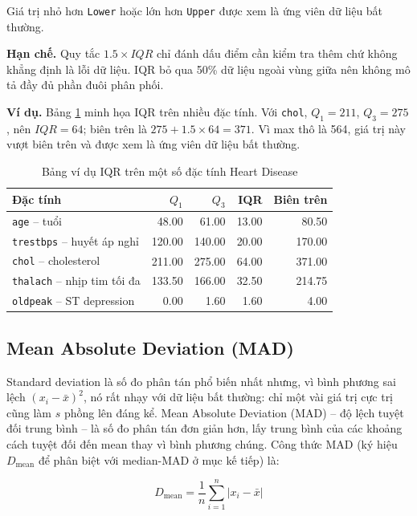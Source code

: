 Giá trị nhỏ hơn \texttt{Lower} hoặc lớn hơn \texttt{Upper} được xem là ứng viên dữ liệu bất thường.

\textbf{Hạn chế.} Quy tắc $1.5\times IQR$ chỉ đánh dấu điểm cần kiểm tra thêm chứ không khẳng định là lỗi dữ liệu. IQR bỏ qua 50\% dữ liệu ngoài vùng giữa nên không mô tả đầy đủ phần đuôi phân phối.

\textbf{Ví dụ.} Bảng \ref{tab:chapter1_iqr_example} minh họa IQR trên nhiều đặc tính. Với \texttt{chol}, $Q_1=211$, $Q_3=275$, nên $IQR=64$; biên trên là $275+1.5\times64=371$. Vì max thô là 564, giá trị này vượt biên trên và được xem là ứng viên dữ liệu bất thường.

\begin{table}[H]
\centering
\caption{Bảng ví dụ IQR trên một số đặc tính Heart Disease}
\label{tab:chapter1_iqr_example}
\small
\begin{tabular}{lrrrr}
\toprule
Đặc tính & $Q_1$ & $Q_3$ & IQR & Biên trên \\
\midrule
\texttt{age} -- tuổi & 48.00 & 61.00 & 13.00 & 80.50 \\
\texttt{trestbps} -- huyết áp nghỉ & 120.00 & 140.00 & 20.00 & 170.00 \\
\texttt{chol} -- cholesterol & 211.00 & 275.00 & 64.00 & 371.00 \\
\texttt{thalach} -- nhịp tim tối đa & 133.50 & 166.00 & 32.50 & 214.75 \\
\texttt{oldpeak} -- ST depression & 0.00 & 1.60 & 1.60 & 4.00 \\
\bottomrule
\end{tabular}
\end{table}

\subsection{Mean Absolute Deviation (MAD)}

Standard deviation là số đo phân tán phổ biến nhất nhưng, vì bình phương sai lệch $(x_i-\bar{x})^2$, nó rất nhạy với dữ liệu bất thường: chỉ một vài giá trị cực trị cũng làm $s$ phồng lên đáng kể. Mean Absolute Deviation (MAD) -- độ lệch tuyệt đối trung bình -- là số đo phân tán đơn giản hơn, lấy trung bình của các khoảng cách tuyệt đối đến mean thay vì bình phương chúng. Công thức MAD (ký hiệu $D_{\text{mean}}$ để phân biệt với median-MAD ở mục kế tiếp) là:

\begin{equation}
D_{\text{mean}} = \frac{1}{n}\sum_{i=1}^{n}\lvert x_i - \bar{x}\rvert
\end{equation}

